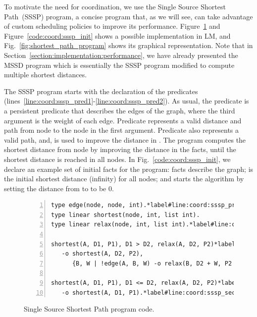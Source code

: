 To motivate the need for coordination, we use the Single Source Shortest
Path~(SSSP) program, a concise program that, as we will see, can take advantage
of custom scheduling policies to improve its performance.
Figure~\ref{code:shortest_path_program} and Figure~\ref{code:coord:sssp_init}
shows a possible implementation in LM, and Fig.~\ref{fig:shortest_path_program}
shows its graphical representation. Note that in
Section~\ref{section:implementation:performance}, we have already presented the
MSSD program which is essentially the SSSP program modified to compute multiple
shortest distances.

The SSSP program starts with the declaration of the predicates~
(lines~\ref{line:coord:sssp_pred1}-\ref{line:coord:sssp_pred2}). As usual, the
 predicate is a persistent predicate that describes the edges of the
graph, where the third argument is the weight of each edge. Predicate
 represents a valid distance and path from node  to the
node in the first argument.  Predicate  also represents a valid
path, and, is used to improve the distance in .  The program
computes the shortest distance from node  by improving the distance in
the  facts, until the shortest distance is reached in all nodes.
In Fig.~\ref{code:coord:sssp_init}, we declare an example set of initial facts
for the program:  facts describe the graph;  is the initial shortest distance (infinity) for all nodes; and
 starts the algorithm by setting the distance from
 to  to be 0.

\begin{figure}[ht]
\begin{Verbatim}[numbers=left,fontsize=\codesize,commandchars=\*\#\&]
type edge(node, node, int).*label#line:coord:sssp_pred1&*hfill// Predicate declaration
type linear shortest(node, int, list int).
type linear relax(node, int, list int).*label#line:coord:sssp_pred2&

shortest(A, D1, P1), D1 > D2, relax(A, D2, P2)*label#line:coord:sssp_first1&*hfill// Rule 1: newly improved path
   -o shortest(A, D2, P2),
      {B, W | !edge(A, B, W) -o relax(B, D2 + W, P2 ++ [B])}.*label#line:coord:sssp_first2&

shortest(A, D1, P1), D1 <= D2, relax(A, D2, P2)*label#line:coord:sssp_second1&*hfill// Rule 2: longer path
   -o shortest(A, D1, P1).*label#line:coord:sssp_second2&
\end{Verbatim}
\caption{Single Source Shortest Path program code.}
\label{code:shortest_path_program}
\end{figure}

